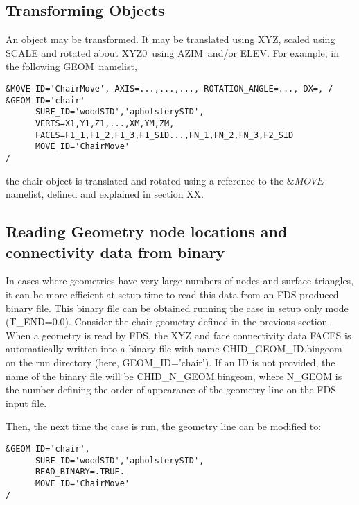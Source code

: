 \documentclass[12pt]{article}
\begin{document}
\subsection{Transforming Objects}
An object may be transformed.
It  may be translated using {\ct XYZ}, scaled using {\ct SCALE} and rotated about {\ct XYZ0}\ using {\ct AZIM}\ and/or {\ct ELEV}.
For example, in the following {\ct GEOM}\ namelist,

{\small
\begin{verbatim}
&MOVE ID='ChairMove', AXIS=...,...,..., ROTATION_ANGLE=..., DX=, /
&GEOM ID='chair'
      SURF_ID='woodSID','apholsterySID',
      VERTS=X1,Y1,Z1,...,XM,YM,ZM,
      FACES=F1_1,F1_2,F1_3,F1_SID...,FN_1,FN_2,FN_3,F2_SID
      MOVE_ID='ChairMove'
/
\end{verbatim}
}

\noindent the chair object is translated and rotated using a reference to the $\&MOVE$ namelist, defined and explained in section XX.


\subsection{Reading Geometry node locations and connectivity data from binary}
\label{subsec:readbin}

In cases where geometries have very large numbers of nodes and surface triangles, it can be more efficient at setup time to read this data from an FDS produced binary file. This binary file can be obtained running the case in setup only mode ({\ct T\_END=0.0}).
Consider the chair geometry defined in the previous section. When a geometry is read by FDS, the {\ct XYZ} and face connectivity data {\ct FACES} is automatically written into a binary file with name {\ct CHID\_GEOM\_ID.bingeom} on the run directory (here, {\ct GEOM\_ID='chair'}). If an {\ct ID} is not provided, the name of the binary file will be  {\ct CHID\_N\_GEOM.bingeom}, where {\ct N\_GEOM} is the number defining the order of appearance of the geometry line on the FDS input file.

Then, the next time the case is run, the geometry line can be modified to:
{\small
\begin{verbatim}
&GEOM ID='chair',
      SURF_ID='woodSID','apholsterySID',
      READ_BINARY=.TRUE.
      MOVE_ID='ChairMove'
/
\end{verbatim}
}
\end{document}
